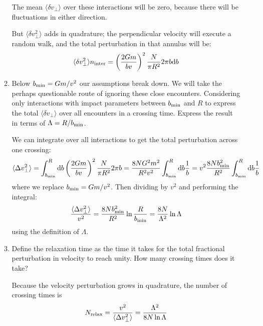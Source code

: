 \begin{enumerate}
\begin{enumerate}
\begin{answer}
The mean $\langle \delta v_\perp\rangle$ over these interactions will
be zero, because there will be fluctuations in either direction.

But $\langle \delta v_\perp^2\rangle$ adds in quadrature; the
perpendicular velocity will execute a random walk, and the total
perturbation in that annulus will be:
\begin{equation}
\langle \delta v_\perp^2\rangle n_{\rm inter}
= \left(\frac{2Gm}{bv}\right)^2 \frac{N}{\pi R^2} 2\pi b {\rm d}b
\end{equation}
\end{answer}

\item Below $b_{\rm min} = Gm/v^2$ our assumptions break down. We will
take the perhaps questionable route of ignoring these close
encounters. Considering only interactions with impact parameters
between $b_{\rm min}$ and $R$ to express the total
$\langle \delta v_\perp\rangle$ over all encounters in a crossing
time. Express the result in terms of $\Lambda = R/b_{\rm min}$.

\begin{answer}
We can integrate over all interactions to get the total perturbation
across one crossing:
\begin{equation}
\langle \Delta v_\perp^2\rangle = \int_{b_{\rm min}}^R  {\rm d}b
\left(\frac{2Gm}{bv}\right)^2 \frac{N}{\pi R^2} 2\pi b
= \frac{8 N G^2 m^2}{R^2 v^2} \int_{b_{\rm min}}^R {\rm d}b \frac{1}{b} 
= v^2 \frac{8 N b_{\rm min}^2}{R^2} \int_{b_{\rm min}}^R {\rm d}b \frac{1}{b} 
\end{equation}
where we replace $b_{\rm min} = Gm / v^2$. 
Then dividing by $v^2$ and performing the integral:
\begin{equation}
\frac{\langle \Delta v_\perp^2\rangle}{v^2} =
\frac{8 N b_{\rm min}^2}{R^2} \ln\frac{R}{b_{\rm min}} = 
\frac{8 N}{\Lambda^2} \ln\Lambda
\end{equation}
using the definition of $\Lambda$.
\end{answer}

\item Define the relaxation time as the time it takes for the total
fractional perturbation in velocity to reach unity. How many crossing
times does it take?

\begin{answer}
Because the velocity perturbation grows in quadrature, the number of
crossing times is
\begin{equation}
N_{\rm relax} = \frac{v^2}{\langle \Delta v_\perp^2\rangle}
= \frac{\Lambda^2}{8N \ln \Lambda}
\end{equation}
\end{answer}


\end{enumerate}
\end{enumerate}
